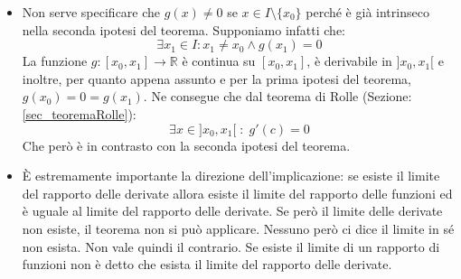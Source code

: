 \begin{itemize}
	\item Non serve specificare che $g(x) \neq 0$ se $x \in I\setminus \{x_0\}$ 
        perché è già intrinseco nella seconda ipotesi del teorema. Supponiamo 
        infatti che:
		\begin{equation*}
			\exists x_1 \in I : x_1 \neq x_0 \land g(x_1) = 0
		\end{equation*}
		La funzione $g:[x_0, x_1] \to \mathbb{R}$ è continua su $[x_0, x_1]$, è 
        derivabile in $]x_0,x_1[$ e inoltre, per quanto appena assunto e per la 
        prima ipotesi del teorema, $g(x_0) = 0 = g(x_1)$. Ne consegue che dal 
        teorema di Rolle (Sezione: \ref{sec_teoremaRolle}):
		\begin{equation*}
			\exists x \in ]x_0, x_1[ \; : \; g'(c) = 0
		\end{equation*}
		Che però è in contrasto con la seconda ipotesi del teorema.

	\item È estremamente importante la direzione dell'implicazione: se esiste 
        il limite del rapporto delle derivate allora esiste il limite del 
        rapporto delle funzioni ed è uguale al limite del rapporto delle 
        derivate. Se però il limite delle derivate non esiste, il teorema non 
        si può applicare. Nessuno però ci dice il limite in sé non esista. Non 
        vale quindi il contrario. Se esiste il limite di un rapporto di 
        funzioni non è detto che esista il limite del rapporto delle derivate.


\end{itemize}
